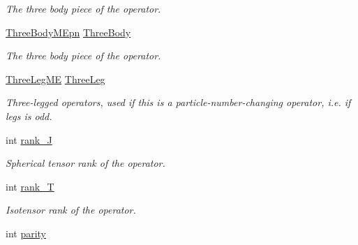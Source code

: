 \begin{DoxyCompactItemize}
\begin{DoxyCompactList}\small\item\em The three body piece of the operator. \end{DoxyCompactList}\item 
\hypertarget{classOperator_a5b2b804f19eadb90d7996a4d7ff97e9f}{\hyperlink{classThreeBodyMEpn}{Three\-Body\-M\-Epn} \hyperlink{classOperator_a5b2b804f19eadb90d7996a4d7ff97e9f}{Three\-Body}}\label{classOperator_a5b2b804f19eadb90d7996a4d7ff97e9f}

\begin{DoxyCompactList}\small\item\em The three body piece of the operator. \end{DoxyCompactList}\item 
\hypertarget{classOperator_a1847eede2232a5e2b0552297269d5972}{\hyperlink{structThreeLegME}{Three\-Leg\-M\-E} \hyperlink{classOperator_a1847eede2232a5e2b0552297269d5972}{Three\-Leg}}\label{classOperator_a1847eede2232a5e2b0552297269d5972}

\begin{DoxyCompactList}\small\item\em Three-\/legged operators, used if this is a particle-\/number-\/changing operator, i.\-e. if legs is odd. \end{DoxyCompactList}\item 
\hypertarget{classOperator_a71a7c194800e2758c42ad0d5f30299aa}{int \hyperlink{classOperator_a71a7c194800e2758c42ad0d5f30299aa}{rank\-\_\-\-J}}\label{classOperator_a71a7c194800e2758c42ad0d5f30299aa}

\begin{DoxyCompactList}\small\item\em Spherical tensor rank of the operator. \end{DoxyCompactList}\item 
\hypertarget{classOperator_ac70ee8dbbc4cb4f61972575c68bb9a51}{int \hyperlink{classOperator_ac70ee8dbbc4cb4f61972575c68bb9a51}{rank\-\_\-\-T}}\label{classOperator_ac70ee8dbbc4cb4f61972575c68bb9a51}

\begin{DoxyCompactList}\small\item\em Isotensor rank of the operator. \end{DoxyCompactList}\item 
\hypertarget{classOperator_ad628e91e2dd2542c0f34e985271adcd3}{int \hyperlink{classOperator_ad628e91e2dd2542c0f34e985271adcd3}{parity}}\label{classOperator_ad628e91e2dd2542c0f34e985271adcd3}


\end{DoxyCompactItemize}
